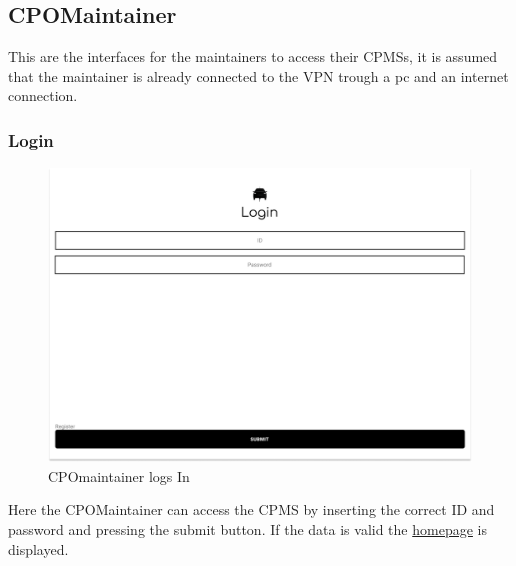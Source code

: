 \subsection{CPOMaintainer}
This are the interfaces for the maintainers to access their \acp{CPMS}, it is assumed that the maintainer is already connected to the \ac{VPN} trough a pc and an internet connection.
\subsubsection{Login}
\begin{figure}[H]
    \centering
    \includegraphics[keepaspectratio, width=15cm]{Mockup/CPMSSiteInterface/Login.png}
    \caption{\ac{CPO}maintainer logs In}
    \label{cpo:Login}
\end{figure}
Here the \ac{CPO}Maintainer can access the \ac{CPMS} by inserting the correct ID and password and pressing the submit button. If the data is valid the \hyperref[cpo:Homepage]{homepage} is displayed.
